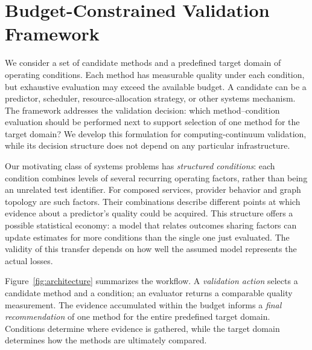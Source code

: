 \documentclass[10pt,a4paper]{article}
\begin{document}
\section{Budget-Constrained Validation Framework}
We consider a set of candidate methods and a predefined target domain of operating conditions. Each method has measurable quality under each condition, but exhaustive evaluation may exceed the available budget. A candidate can be a predictor, scheduler, resource-allocation strategy, or other systems mechanism. The framework addresses the validation decision: which method--condition evaluation should be performed next to support selection of one method for the target domain? We develop this formulation for computing-continuum validation, while its decision structure does not depend on any particular infrastructure.

Our motivating class of systems problems has \emph{structured conditions}: each condition combines levels of several recurring operating factors, rather than being an unrelated test identifier. For composed services, provider behavior and graph topology are such factors. Their combinations describe different points at which evidence about a predictor's quality could be acquired. This structure offers a possible statistical economy: a model that relates outcomes sharing factors can update estimates for more conditions than the single one just evaluated. The validity of this transfer depends on how well the assumed model represents the actual losses.

Figure~\ref{fig:architecture} summarizes the workflow. A \emph{validation action} selects a candidate method and a condition; an evaluator returns a comparable quality measurement. The evidence accumulated within the budget informs a \emph{final recommendation} of one method for the entire predefined target domain. Conditions determine where evidence is gathered, while the target domain determines how the methods are ultimately compared.
\end{document}
